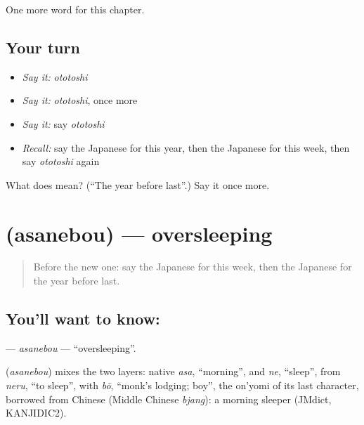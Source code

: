 \begin{grammarlens}[title={What you've built}]
One more word for this chapter.
\end{grammarlens}

\subsection*{Your turn}
\begin{itemize}
\raggedright
  \item \emph{Say it:} \emph{ototoshi}
  \item \emph{Say it:} \emph{ototoshi}, once more
  \item \emph{Say it:} say \emph{ototoshi}
  \item \emph{Recall:} say the Japanese for this year, then the Japanese for this week, then say \emph{ototoshi} again
\end{itemize}

\begin{tcolorbox}[breakable,colback=teal!4,colframe=teal!35!black,title={Before you move on}]
What does  mean? (\textquotedblleft{}The year before last\textquotedblright{}.) Say it once more.
\end{tcolorbox}
\section[\texorpdfstring{\ja{あさねぼう} (asanebou)}{あさねぼう (asanebou)}]{ (asanebou) — oversleeping}

\label{lesson:JA-C75-asanebou}



\begin{quote}
Before the new one: say the Japanese for this week, then the Japanese for the year before last.
\end{quote}

\subsection*{You'll want to know: }
\textbf{} — \emph{asanebou} — \textquotedblleft{}oversleeping\textquotedblright{}.

\begin{cousinweb}
\textbf{} (\emph{asanebou}) mixes the two layers: native \emph{asa}, \textquotedblleft{}morning\textquotedblright{}, and \emph{ne}, \textquotedblleft{}sleep\textquotedblright{}, from \emph{neru}, \textquotedblleft{}to sleep\textquotedblright{}, with \emph{bō}, \textquotedblleft{}monk's lodging; boy\textquotedblright{}, the on'yomi of its last character, borrowed from Chinese (Middle Chinese \emph{bjang}): a morning sleeper (JMdict, KANJIDIC2).
\end{cousinweb}

